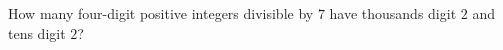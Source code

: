 How many four-digit positive integers divisible by $7$ have thousands digit $2$ and tens digit $2$?
